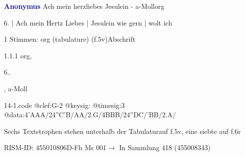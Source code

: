 \documentclass[twocolumn, 12pt]{book}
\begin{document}
\par \vspace{16pt} \textcolor{darkblue}{\textbf{Anonymus  }}\hfillplus{\textbf{[14]}}\newline Ach mein herzliebes Jesulein - a-Moll\newline org
\par \begin{itshape}[f.5v, at left:] 6. | Ach mein Hertz Liebes | Jesulein wie gern | wolt ich\end{itshape} 
\par \textcolor{darkblue}{}  1 Stimmen: org (tabulature)  (f.5v)\newline Abschrift
\par 1.1.1  org, \begin{itshape}6..\end{itshape}, a-Moll\newline \begin{footnotesize}  \end{footnotesize}  
\begin{filecontents*}{14-1.code}
@clef:G-2
@keysig:
@timesig:3
@data:4'AAA/24''C'B/AA/2.G/4BBB/24''DC/'BB/2.A/
\end{filecontents*}
\newline %
\par Sechs Textstrophen stehen unterhalb der Tabulaturauf f.5v, eine siebte auf f.6r
\par RISM-ID: 455010806\newline D-Fh  Ms 001\newline $\rightarrow$ In Sammlung 418 (455008343)
      
\end{document}
